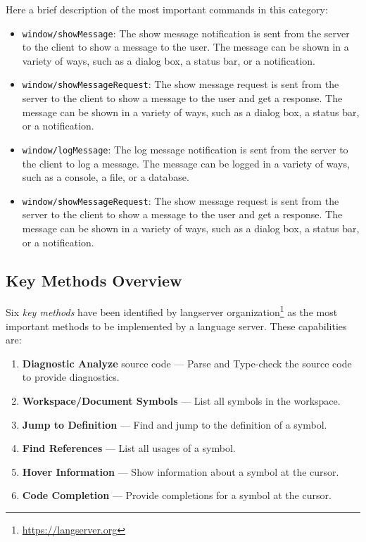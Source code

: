 Here a brief description of the most important commands in this category:
\begin{itemize}
    \item \texttt{window/showMessage}: The show message notification is sent from the server to the client to show a message to the user. The message can be shown in a variety of ways, such as a dialog box, a status bar, or a notification.
    \item \texttt{window/showMessageRequest}: The show message request is sent from the server to the client to show a message to the user and get a response. The message can be shown in a variety of ways, such as a dialog box, a status bar, or a notification.
    \item \texttt{window/logMessage}: The log message notification is sent from the server to the client to log a message. The message can be logged in a variety of ways, such as a console, a file, or a database.
    \item \texttt{window/showMessageRequest}: The show message request is sent from the server to the client to show a message to the user and get a response. The message can be shown in a variety of ways, such as a dialog box, a status bar, or a notification.
\end{itemize}

\subsection{Key Methods Overview}\label{subsec:KeyMethodsOverview}

Six \textit{key methods} have been identified by langserver organization\footnote{\url{https://langserver.org}} as the most important methods to be implemented by a language server. These capabilities are:
\begin{enumerate}
    \item \textbf{Diagnostic Analyze} source code --- Parse and Type-check the source code to provide diagnostics.
    \item \textbf{Workspace/Document Symbols} --- List all symbols in the workspace.
    \item \textbf{Jump to Definition} --- Find and jump to the definition of a symbol.
    \item \textbf{Find References} --- List all usages of a symbol.
    \item \textbf{Hover Information} --- Show information about a symbol at the cursor.
    \item \textbf{Code Completion} --- Provide completions for a symbol at the cursor.
\end{enumerate}

